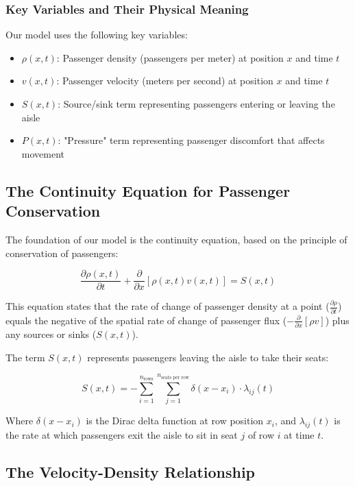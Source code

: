 \documentclass[a4paper,12pt]{article}
\begin{document}
\subsubsection{Key Variables and Their Physical Meaning}

Our model uses the following key variables:

\begin{itemize}
    \item $\rho(x,t)$: Passenger density (passengers per meter) at position $x$ and time $t$
    \item $v(x,t)$: Passenger velocity (meters per second) at position $x$ and time $t$
    \item $S(x,t)$: Source/sink term representing passengers entering or leaving the aisle
    \item $P(x,t)$: "Pressure" term representing passenger discomfort that affects movement
\end{itemize}

\subsection{The Continuity Equation for Passenger Conservation}

The foundation of our model is the continuity equation, based on the principle of conservation of passengers:

\begin{equation}
\frac{\partial \rho(x,t)}{\partial t} + \frac{\partial}{\partial x}[\rho(x,t)v(x,t)] = S(x,t)
\end{equation}

This equation states that the rate of change of passenger density at a point ($\frac{\partial \rho}{\partial t}$) equals the negative of the spatial rate of change of passenger flux ($-\frac{\partial}{\partial x}[\rho v]$) plus any sources or sinks ($S(x,t)$).

The term $S(x,t)$ represents passengers leaving the aisle to take their seats:

\begin{equation}
S(x,t) = -\sum_{i=1}^{n_{\text{rows}}} \sum_{j=1}^{n_{\text{seats per row}}} \delta(x - x_i) \cdot \lambda_{ij}(t)
\end{equation}

Where $\delta(x - x_i)$ is the Dirac delta function at row position $x_i$, and $\lambda_{ij}(t)$ is the rate at which passengers exit the aisle to sit in seat $j$ of row $i$ at time $t$.

\subsection{The Velocity-Density Relationship}
\end{document}
